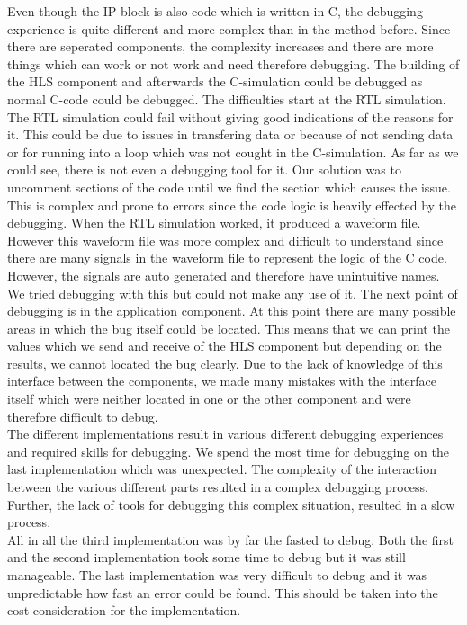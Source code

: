 \documentclass[conference]{IEEEtran}
\begin{document}
Even though the IP block is also code which is written in C, the debugging experience is quite different and more complex than in the method before. Since there are seperated components, the complexity increases and there are more things which can work or not work and need therefore debugging. The building of the HLS component and afterwards the C-simulation could be debugged as normal C-code could be debugged. The difficulties start at the RTL simulation. The RTL simulation could fail without giving good indications of the reasons for it. This could be due to issues in transfering data or because of not sending data or for running into a loop which was not cought in the C-simulation. As far as we could see, there is not even a debugging tool for it. Our solution was to uncomment sections of the code until we find the section which causes the issue. This is complex and prone to errors since the code logic is heavily effected by the debugging. When the RTL simulation worked, it produced a waveform file. However this waveform file was more complex and difficult to understand since there are many signals in the waveform file to represent the logic of the C code. However, the signals are auto generated and therefore have unintuitive names. We tried debugging with this but could not make any use of it. The next point of debugging is in the application component. At this point there are many possible areas in which the bug itself could be located. This means that we can print the values which we send and receive of the HLS component but depending on the results, we cannot located the bug clearly. Due to the lack of knowledge of this interface between the components, we made many mistakes with the interface itself which were neither located in one or the other component and were therefore difficult to debug. \\
The different implementations result in various different debugging experiences and required skills for debugging. We spend the most time for debugging on the last implementation which was unexpected. The complexity of the interaction between the various different parts resulted in a complex debugging process. Further, the lack of tools for debugging this complex situation, resulted in a slow process. \\
All in all the third implementation was by far the fasted to debug. Both the first and the second implementation took some time to debug but it was still manageable. The last implementation was very difficult to debug and it was unpredictable how fast an error could be found. This should be taken into the cost consideration for the implementation.
\end{document}
